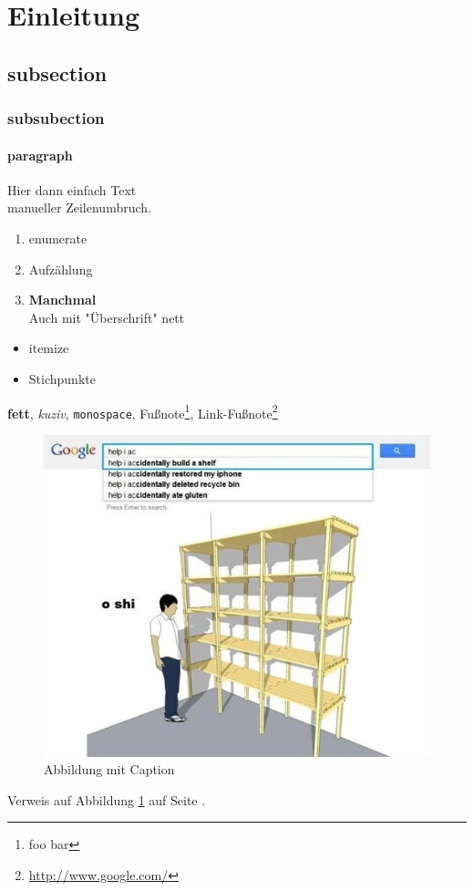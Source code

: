 \clearpage
{}
\section{Einleitung}
\subsection{subsection}
\subsubsection{subsubection}
\paragraph{paragraph}
Hier dann einfach Text\\
manueller Zeilenumbruch.
\begin{enumerate}
	\item enumerate
	\item Aufzählung
	\item \textbf{Manchmal}\\
	Auch mit "Überschrift" nett
\end{enumerate}
\begin{itemize}
	\item itemize
	\item Stichpunkte
\end{itemize}
\textbf{fett}, \emph{kuziv}, \texttt{monospace}, Fußnote\footnote{foo bar}, Link-Fußnote\footnote{\url{http://www.google.com/}}
\begin{figure}[htb]
\centering
\includegraphics[width=\textwidth]{img/foo.png}
\caption{Abbildung mit Caption}
\label{fig:foo_00}
\end{figure}
Verweis auf Abbildung \ref{fig:foo_00} auf Seite \pageref{fig:foo_00}.
